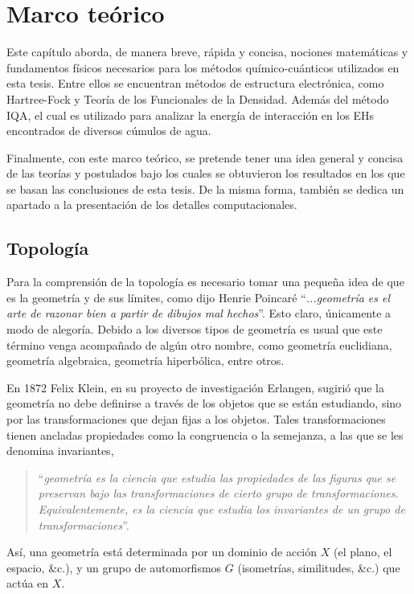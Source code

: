 \chapter{Marco teórico}

Este capítulo aborda, de manera breve, rápida y concisa, nociones matemáticas y
fundamentos físicos necesarios para los métodos químico-cuánticos utilizados en
esta tesis. Entre ellos se encuentran métodos de estructura electrónica, como
Hartree-Fock y Teoría de los Funcionales de la Densidad. Además del método IQA,
el cual es utilizado para analizar  la energía de interacción en los EHs
encontrados de diversos cúmulos de agua.

Finalmente, con este marco teórico, se pretende tener una idea general y
concisa de las teorías y postulados bajo los cuales se obtuvieron los
resultados en los que se basan las conclusiones de esta tesis. De la misma
forma, también se dedica un apartado a la presentación de los detalles
computacionales.

\section{Topología}

Para la comprensión de la topología es necesario tomar una pequeña idea de que
es la geometría y de sus límites, como dijo Henrie Poincaré ``{\em ...geometría
es el arte de razonar bien a partir de dibujos mal hechos}''. Esto claro,
únicamente a modo de alegoría. Debido a los diversos tipos de geometría es
usual que este término venga acompañado de algún otro nombre, como geometría
euclidiana, geometría algebraica, geometría hiperbólica, entre otros.

En 1872 Felix Klein, en su proyecto de investigación Erlangen, sugirió que la
geometría no debe definirse a través de los objetos que se están estudiando,
sino por las transformaciones que dejan fijas a los objetos. Tales
transformaciones tienen ancladas propiedades como la congruencia o la
semejanza, a las que se les denomina invariantes,
\color{blue}
  \begin{quote}
    ``{\em geometría es la ciencia que estudia las propiedades de las figuras
    que se preservan bajo las transformaciones de cierto grupo de transformaciones.
    Equivalentemente, es la ciencia que estudia los invariantes de un grupo
    de transformaciones}''.
  \end{quote}
\color{black}
Así, una geometría está determinada por un dominio de acción $X$ (el plano, el
espacio, \&c.), y un grupo de automorfismos $G$ (isometrías, similitudes, \&c.)
que actúa en $X$.

